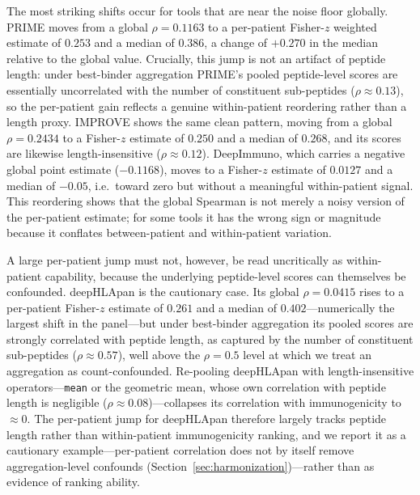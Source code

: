 The most striking shifts occur for tools that are near the noise floor globally.
PRIME moves from a global $\rho = 0.1163$ to a per-patient Fisher-$z$ weighted
estimate of $0.253$ and a median of $0.386$, a change of $+0.270$ in the median
relative to the global value. Crucially, this jump is not an artifact of peptide
length: under best-binder aggregation PRIME's pooled peptide-level scores are
essentially uncorrelated with the number of constituent sub-peptides
($\rho \approx 0.13$), so the per-patient gain reflects a genuine within-patient
reordering rather than a length proxy. IMPROVE shows the same clean pattern, moving
from a global $\rho = 0.2434$ to a Fisher-$z$ estimate of $0.250$ and a median of
$0.268$, and its scores are likewise length-insensitive ($\rho \approx 0.12$).
DeepImmuno, which carries a negative global point estimate ($-0.1168$), moves to a
Fisher-$z$ estimate of $0.0127$ and a median of $-0.05$, i.e.\ toward zero but
without a meaningful within-patient signal. This
reordering shows that the global Spearman is not merely a noisy version of the
per-patient estimate; for some tools it has the wrong sign or magnitude because
it conflates between-patient and within-patient variation.

A large per-patient jump must not, however, be read uncritically as within-patient
capability, because the underlying peptide-level scores can themselves be
confounded. deepHLApan is the cautionary case. Its global $\rho = 0.0415$ rises to
a per-patient Fisher-$z$ estimate of $0.261$ and a median of $0.402$---numerically
the largest shift in the panel---but under best-binder aggregation its pooled
scores are strongly correlated with peptide length, as captured by the number of
constituent sub-peptides ($\rho \approx 0.57$), well above the $\rho = 0.5$ level
at which we treat an aggregation as count-confounded. Re-pooling deepHLApan with
length-insensitive operators---\texttt{mean} or the geometric mean, whose own
correlation with peptide length is negligible ($\rho \approx 0.08$)---collapses its
correlation with immunogenicity to $\approx 0$. The per-patient jump for deepHLApan
therefore largely tracks peptide length rather than within-patient immunogenicity
ranking, and we report it as a cautionary example---per-patient correlation does
not by itself remove aggregation-level confounds
(Section~\ref{sec:harmonization})---rather than as evidence of ranking ability.

